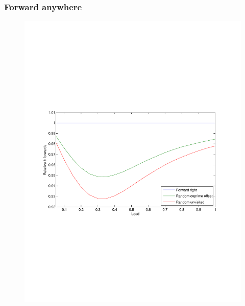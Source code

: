 \documentclass[compress]{beamer}
\begin{document}
\begin{frame}
\frametitle{Forward anywhere}
\begin{figure}[h!tb]
\includegraphics[width=\textwidth,clip=true,trim=3em 22em 6em 23em]{../resources/validate.pdf}
\end{figure}
\end{frame}
\end{document}
